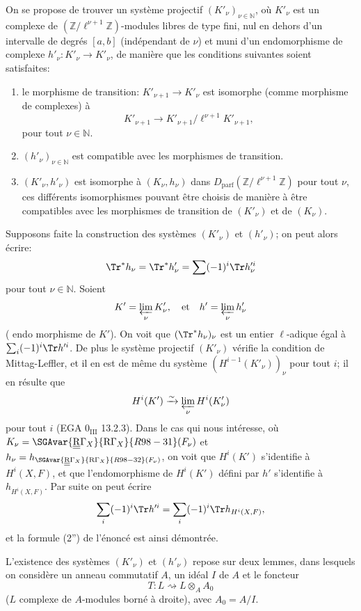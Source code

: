 On se propose de trouver un système projectif $(K'_\nu)_{\nu\in\mathbb{N}}$, où $K'_\nu$ est un complexe de $(\mathbb{Z}/\ell^{\nu+1}\mathbb{Z})$-modules libres de type fini, nul en dehors d'un intervalle de degrés $[a,b]$ (indépendant de $\nu$) et muni d'un endomorphisme de complexe $h'_\nu:K'_\nu\to K'_\nu$, de manière que les conditions suivantes soient satisfaites:
\begin{enumerate}[label=\arabic*)]
\item le morphisme de transition: $K'_{\nu+1}\to K'_\nu$ est isomorphe (comme morphisme de complexes) à
\[
K'_{\nu+1}\to K'_{\nu+1}/\ell^{\nu+1}K'_{\nu+1},
\]
pour tout $\nu\in\mathbb{N}$.
\item $(h'_\nu)_{\nu\in\mathbb{N}}$ est compatible avec les morphismes de transition.
\item $(K'_\nu,h'_\nu)$ est isomorphe à $(K_\nu,h_\nu)$ dans $D_{\mathrm{parf}}(\mathbb{Z}/\ell^{\nu+1}\mathbb{Z})$ pour tout $\nu$, ces différents isomorphismes pouvant être choisis de manière à être compatibles avec les morphismes de transition de $(K'_\nu)$ et de $(K_\nu)$.
\end{enumerate}
Supposons faite la construction des systèmes $(K'_\nu)$ et $(h'_\nu)$; on peut alors écrire:
\[
\Tr^*h_\nu=\Tr^*h'_\nu=\sum(-1)^i\Tr h_\nu'^i
\]
pour tout $\nu\in\mathbb{N}$. Soient
\[
K'=\varprojlim_\nu K'_\nu,
\quad\text{et}\quad h'=\varprojlim_\nu h'_\nu
\]
(
endo%
morphisme de $K'$). On voit que $(\Tr^*h_\nu)_\nu$ est un entier $\ell$-adique égal à $\sum_i(-1)^i\Tr h'^i$. De plus le système projectif $(K'_\nu)$ vérifie la condition de Mittag-Leffler, et il en est de même du système $(H^{i-1}(K'_\nu))_\nu$ pour tout $i$; il en résulte que
\[
H^i(K')\xrightarrow{\sim}\varprojlim_\nu H^i(K'_\nu)
\]
pour tout $i$ (EGA $0_{\mathrm{III}}$ 13.2.3). Dans le cas qui nous intéresse, où $K_\nu=\SGAvar{\underline{\underline{\mathrm{R}}}\Gamma_X}{\mathrm{R}\Gamma_X}{R98-31}(F_\nu)$ et $h_\nu=h_{\SGAvar{\underline{\underline{\mathrm{R}}}\Gamma_X}{\mathrm{R}\Gamma_X}{R98-32}(F_\nu)}$, on voit que $H^i(K')$ s'identifie à $H^i(X,F)$, et que l'endomorphisme de $H^i(K')$ défini par $h'$ s'identifie à $h_{H^i(X,F)}$. Par suite on peut écrire
\[
\sum_i(-1)^i\Tr h'^i=
\sum_i(-1)^i\Tr h_{H^i(X,F)},
\]
et la formule (2'') de l'énoncé est ainsi démontrée.

L'existence des systèmes $(K'_\nu)$ et $(h'_\nu)$ repose sur deux lemmes, dans lesquels on considère un anneau commutatif $A$, un idéal $I$ de $A$ et le foncteur
\[
T:L\rightsquigarrow L\otimes_A A_0
\]
($L$ complexe de $A$-modules borné à droite), avec $A_0=A/I$.

